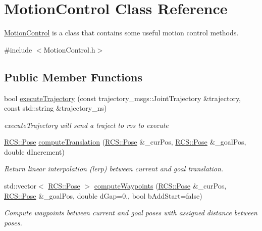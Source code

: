\hypertarget{classMotionControl}{\section{Motion\-Control Class Reference}
\label{classMotionControl}
}


\hyperlink{classMotionControl}{Motion\-Control} is a class that contains some useful motion control methods.  




{\ttfamily \#include $<$Motion\-Control.\-h$>$}

\subsection*{Public Member Functions}
\begin{DoxyCompactItemize}
\item 
bool \hyperlink{classMotionControl_a7d4bdb16c10626850dac271d30428f71}{execute\-Trajectory} (const trajectory\-\_\-msgs\-::\-Joint\-Trajectory \&trajectory, const std\-::string \&trajectory\-\_\-ns)
\begin{DoxyCompactList}\small\item\em execute\-Trajectory will send a traject to ros to execute \end{DoxyCompactList}\item 
\hyperlink{namespaceRCS_aa07e45d8a50e30064283d2b38087f999}{R\-C\-S\-::\-Pose} \hyperlink{classMotionControl_a9d242a51b301d7c87c16f579e0d9347e}{compute\-Translation} (\hyperlink{namespaceRCS_aa07e45d8a50e30064283d2b38087f999}{R\-C\-S\-::\-Pose} \&\-\_\-cur\-Pos, \hyperlink{namespaceRCS_aa07e45d8a50e30064283d2b38087f999}{R\-C\-S\-::\-Pose} \&\-\_\-goal\-Pos, double d\-Increment)
\begin{DoxyCompactList}\small\item\em Return linear interpolation (lerp) between current and goal translation. \end{DoxyCompactList}\item 
std\-::vector$<$ \hyperlink{namespaceRCS_aa07e45d8a50e30064283d2b38087f999}{R\-C\-S\-::\-Pose} $>$ \hyperlink{classMotionControl_a40113f305b3accd4d28fa976151aa954}{compute\-Waypoints} (\hyperlink{namespaceRCS_aa07e45d8a50e30064283d2b38087f999}{R\-C\-S\-::\-Pose} \&\-\_\-cur\-Pos, \hyperlink{namespaceRCS_aa07e45d8a50e30064283d2b38087f999}{R\-C\-S\-::\-Pose} \&\-\_\-goal\-Pos, double d\-Gap=0., bool b\-Add\-Start=false)
\begin{DoxyCompactList}\small\item\em Compute waypoints between current and goal poses with assigned distance between poses. \end{DoxyCompactList}\item 

\end{DoxyCompactItemize}
